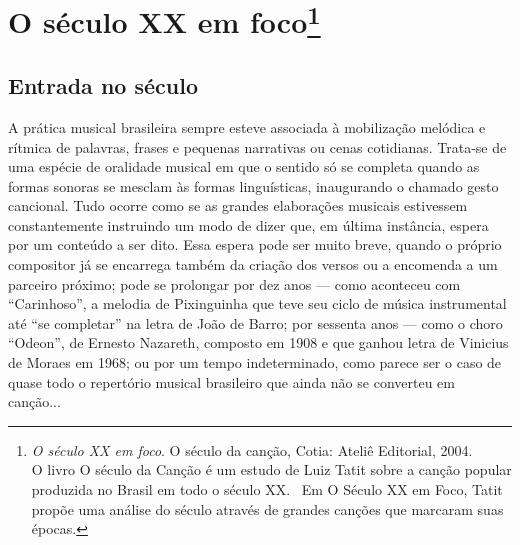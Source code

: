 








\chapter{O século XX em foco\footnote{\textit{O século XX em foco}. O século da canção, Cotia: Ateliê Editorial, 2004.\\
O livro O século da Canção é um estudo de Luiz Tatit
sobre a canção popular produzida no Brasil em todo o século XX.~ Em O
Século XX em Foco, Tatit propõe uma análise do século através de grandes
canções que marcaram suas épocas.}} 



\section{Entrada no século}

A prática musical brasileira sempre esteve associada à mobilização
melódica e rítmica de palavras, frases e pequenas narrativas ou cenas
cotidianas. Trata-se de uma espécie de oralidade musical em que o
sentido só se completa quando as formas sonoras se mesclam às formas
linguísticas, inaugurando o chamado gesto cancional. Tudo ocorre como se
as grandes elaborações musicais estivessem constantemente instruindo um
modo de dizer que, em última instância, espera por um conteúdo a ser
dito. Essa espera pode ser muito breve, quando o próprio compositor já
se encarrega também da criação dos versos ou a encomenda a um parceiro
próximo; pode se prolongar por dez anos --- como aconteceu com
``Carinhoso'', a melodia de Pixinguinha que teve seu ciclo de música
instrumental até ``se completar'' na letra de João de Barro; por
sessenta anos --- como o choro ``Odeon'', de Ernesto Nazareth, composto
em 1908 e que ganhou letra de Vinicius de Moraes em 1968; ou por um
tempo indeterminado, como parece ser o caso de quase todo o repertório
musical brasileiro que ainda não se converteu em canção...

